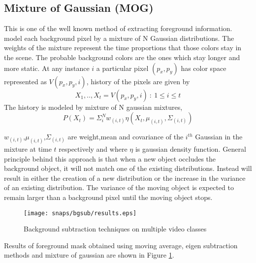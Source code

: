 \subsection{Mixture of Gaussian (MOG)}
This is one of the well known method of extracting foreground information. \cite{kaew} model each background pixel by a mixture of N Gaussian distributions. The weights of the mixture represent the time proportions that those colors stay in the scene. The probable background colors are the ones which stay longer and more static. At any instance $i$ a particular pixel $(p_x,p_y)$ has color space represented as $V(p_{x},p_{y},i)$, history of the pixels are given by 
$$X_{1},..,X_{t} = {V(p_{x},p_{y},i)~:~1\le i \le t }$$
The history is modeled by mixture of N gaussian mixtures,
$$P(X_{t})=\Sigma_{i}^{N}w_{(i,t)}\eta(X_{t},\mu_{(i,t)},\Sigma_{(i,t)})$$
\par $w_{(i,t)}$,$\mu_{(i,t)}$,$\Sigma_{(i,t)}$ are weight,mean and covariance of the $i^{th}$ Gaussian in the mixture at time $t$ respectively and where $\eta$ is gaussian density function. General principle behind this approach is that when a new object occludes the background object, it will not match one of the existing distributions. Instead will result in either the creation of a new distribution or the increase in the variance of an existing distribution. The variance of the moving object is expected to remain larger than a background pixel until the moving object stops.
\begin{figure}[htpb]
   \begin{center}
	    \texttt{[image: snaps/bgsub/results.eps]}     
     \caption {Background subtraction techniques on multiple video classes}
   \label{fig:bgsub}
   \end{center}
 \end{figure}
\par Results of foreground mask obtained using moving average, eigen subtraction methods and mixture of gaussian are shown in Figure \ref{fig:bgsub}. 



